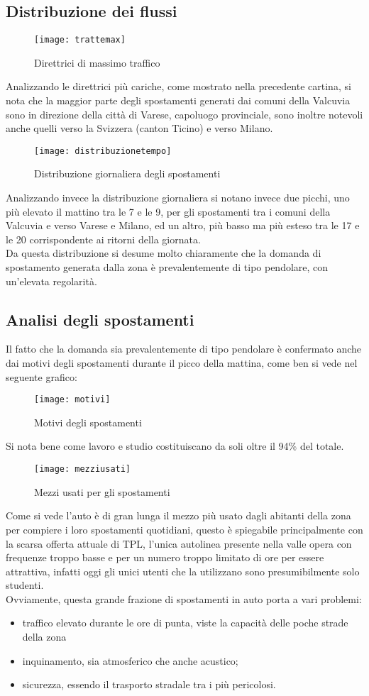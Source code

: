 \documentclass{article}
\begin{document}
 \subsection{Distribuzione dei flussi}
\begin{figure}[H]
\centering
\texttt{[image: trattemax]}
\caption{Direttrici di massimo traffico}
\end{figure}
Analizzando le direttrici più cariche, come mostrato nella precedente cartina, si nota che la maggior parte degli spostamenti generati dai comuni della Valcuvia sono in direzione della città di Varese, capoluogo provinciale, sono inoltre notevoli anche quelli verso la Svizzera (canton Ticino) e verso Milano.\\
\begin{figure}[H]
\centering
\texttt{[image: distribuzionetempo]}
\caption{Distribuzione giornaliera degli spostamenti}
\end{figure}
Analizzando invece la distribuzione giornaliera si notano invece due picchi, uno più elevato il mattino tra le 7 e le 9, per gli spostamenti tra i comuni della Valcuvia e verso Varese e Milano, ed un altro, più basso ma più esteso tra le 17 e le 20 corrispondente ai ritorni della giornata.\\
Da questa distribuzione si desume molto chiaramente che la domanda di spostamento generata dalla zona è prevalentemente di tipo pendolare, con un'elevata regolarità.
\subsection{Analisi degli spostamenti}
Il fatto che la domanda sia prevalentemente di tipo pendolare è confermato anche dai motivi degli spostamenti durante il picco della mattina, come ben si vede nel seguente grafico:
\begin{figure}[H]
\centering
\texttt{[image: motivi]}
\caption{Motivi degli spostamenti}
\end{figure}
Si nota bene come lavoro e studio costituiscano da soli oltre il 94\% del totale.
\begin{figure}[H]
\centering
\texttt{[image: mezziusati]}
\caption{Mezzi usati per gli spostamenti}
\end{figure}
Come si vede l'auto è di gran lunga il mezzo più usato dagli abitanti della zona per compiere i loro spostamenti quotidiani, questo è spiegabile principalmente con la scarsa offerta attuale di TPL, l'unica autolinea presente nella valle opera con frequenze troppo basse e per un numero troppo limitato di ore per essere attrattiva, infatti oggi gli unici utenti che la utilizzano sono presumibilmente solo studenti.\\
Ovviamente, questa grande frazione di spostamenti in auto porta a vari problemi: 
\begin{itemize}
\item traffico elevato durante le ore di punta, viste la capacità delle poche strade della zona
\item inquinamento, sia atmosferico che anche acustico;
\item sicurezza, essendo il trasporto stradale tra i più pericolosi.
\end{itemize}
\newpage
\end{document}
